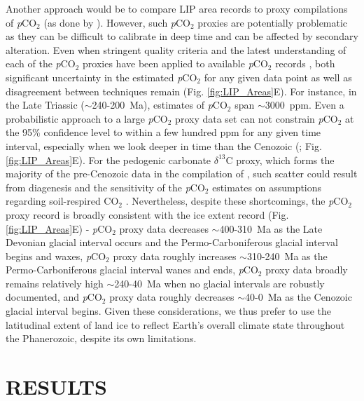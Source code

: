 \documentclass[11pt,letterpaper]{article}
\newcommand{\dC}{$\delta^{13}$C\xspace}
\begin{document}
Another approach would be to compare LIP area records to proxy compilations of \textit{p}CO$_2$ (as done by \citealt{Johansson2018a}). However, such \textit{p}CO$_2$ proxies are potentially problematic as they can be difficult to calibrate in deep time and can be affected by secondary alteration. Even when stringent quality criteria and the latest understanding of each of the \textit{p}CO$_2$ proxies have been applied to available \textit{p}CO$_2$ records \citep{Foster2017a}, both significant uncertainty in the estimated \textit{p}CO$_2$ for any given data point as well as disagreement between techniques remain (Fig. \ref{fig:LIP_Areas}E). For instance, in the Late Triassic ($\sim$240-200~Ma), estimates of \textit{p}CO$_2$ span $\sim$3000~ppm. Even a probabilistic approach to a large \textit{p}CO$_2$ proxy data set can not constrain \textit{p}CO$_2$ at the 95\% confidence level to within a few hundred ppm for any given time interval, especially when we look deeper in time than the Cenozoic (\citealp{Foster2017a}; Fig. \ref{fig:LIP_Areas}E). For the pedogenic carbonate \dC proxy, which forms the majority of the pre-Cenozoic data in the compilation of \citet{Foster2017a}, such scatter could result from diagenesis \citep{Michel2016a} and the sensitivity of the \textit{p}CO$_2$ estimates on assumptions regarding soil-respired CO$_{2}$ \citep{Montanez2013a}. Nevertheless, despite these shortcomings, the \textit{p}CO$_2$ proxy record is broadly consistent with the ice extent record (Fig. \ref{fig:LIP_Areas}E) - \textit{p}CO$_2$ proxy data decreases $\sim$400-310~Ma as the Late Devonian glacial interval occurs and the Permo-Carboniferous glacial interval begins and waxes, \textit{p}CO$_2$ proxy data roughly increases $\sim$310-240~Ma as the Permo-Carboniferous glacial interval wanes and ends, \textit{p}CO$_2$ proxy data broadly remains relatively high $\sim$240-40~Ma when no glacial intervals are robustly documented, and \textit{p}CO$_2$ proxy data roughly decreases $\sim$40-0~Ma as the Cenozoic glacial interval begins. Given these considerations, we thus prefer to use the latitudinal extent of land ice to reflect Earth's overall climate state throughout the Phanerozoic, despite its own limitations.

\section*{RESULTS}
\end{document}

